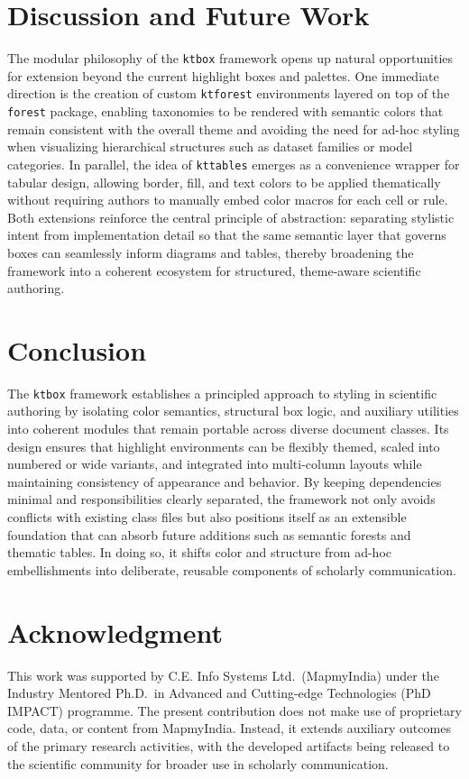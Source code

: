 \documentclass[12pt,onecolumn]{article}
\begin{document}
  \section{Discussion and Future Work}
  \label{sec:discussion-and-future-work}
The modular philosophy of the \texttt{ktbox} framework opens up natural opportunities for extension beyond the current highlight boxes and palettes. One immediate direction is the creation of custom \texttt{ktforest} environments layered on top of the \texttt{forest} package, enabling taxonomies to be rendered with semantic colors that remain consistent with the overall theme and avoiding the need for ad-hoc styling when visualizing hierarchical structures such as dataset families or model categories. In parallel, the idea of \texttt{kttables} emerges as a convenience wrapper for tabular design, allowing border, fill, and text colors to be applied thematically without requiring authors to manually embed color macros for each cell or rule. Both extensions reinforce the central principle of abstraction: separating stylistic intent from implementation detail so that the same semantic layer that governs boxes can seamlessly inform diagrams and tables, thereby broadening the framework into a coherent ecosystem for structured, theme-aware scientific authoring.


  \section{Conclusion}
  \label{sec:conclusion}
The \texttt{ktbox} framework establishes a principled approach to styling in scientific authoring by isolating color semantics, structural box logic, and auxiliary utilities into coherent modules that remain portable across diverse document classes. Its design ensures that highlight environments can be flexibly themed, scaled into numbered or wide variants, and integrated into multi-column layouts while maintaining consistency of appearance and behavior. By keeping dependencies minimal and responsibilities clearly separated, the framework not only avoids conflicts with existing class files but also positions itself as an extensible foundation that can absorb future additions such as semantic forests and thematic tables. In doing so, it shifts color and structure from ad-hoc embellishments into deliberate, reusable components of scholarly communication.


  \section*{Acknowledgment}
This work was supported by C.E. Info Systems Ltd.\ (MapmyIndia) under the Industry Mentored Ph.D.\ in Advanced and Cutting-edge Technologies (PhD IMPACT) programme. The present contribution does not make use of proprietary code, data, or content from MapmyIndia. Instead, it extends auxiliary outcomes of the primary research activities, with the developed artifacts being released to the scientific community for broader use in scholarly communication.
\end{document}

